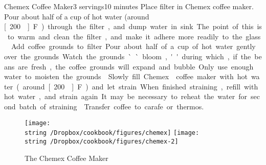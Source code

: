 \begin{recipe}{Chemex\textsuperscript{\texttrademark} Coffee Maker}{3 servings}{10 minutes}
Place filter in Chemex\textsuperscript{\texttrademark} coffee maker.  Pour about half of a cup of hot water (around \unit[200\0]{F}) through the filter, and dump water in sink.  The point of this is to warm and clean the filter, and make it adhere more readily to the glass.
Add coffee grounds to filter.  Pour about half of a cup of hot water gently over the grounds.  Watch the grounds ``bloom,'' during which, if the beans are fresh, the coffee grounds will expand and bubble.  Only use enough water to moisten the grounds.
\newstep
Slowly fill Chemex\textsuperscript{\texttrademark} coffee maker with hot water (around \unit[200\0]{F}) and let strain.  When finished straining, refill with hot water, and strain again.  It may be necessary to reheat the water for second batch of straining.
\newstep
Transfer coffee to carafe or thermos.
\end{recipe}
\begin{figure}[b!]
\begin{center}
\texttt{[image: \\string~/Dropbox/cookbook/figures/chemex]}
\hspace{0.1\textwidth}
\texttt{[image: \\string~/Dropbox/cookbook/figures/chemex-2]}
\end{center}
\caption*{The Chemex\tm{} Coffee Maker}
\end{figure}
